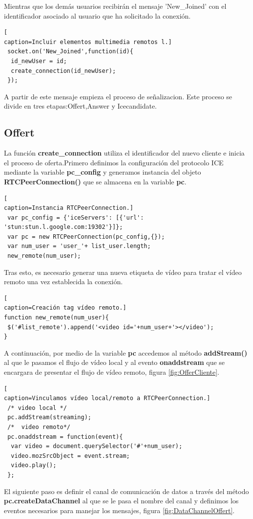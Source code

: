 Mientras que los demás usuarios recibirán el mensaje 'New\_Joined' con el identificador asociado al usuario que ha solicitado la conexión.
\begin{lstlisting}[
caption=Incluir elementos multimedia remotos l.]
 socket.on('New_Joined',function(id){
  id_newUser = id;
  create_connection(id_newUser);
 });
\end{lstlisting}
A partir de este mensaje empieza el proceso de señalizacion. Este proceso se divide en tres etapas:Offert,Answer y Icecandidate.
\subsection*{Offert}
La función \textbf{create\_connection} utiliza el identificador del nuevo cliente e inicia el proceso de oferta.Primero definimos la configuración del  protocolo ICE mediante la variable \textbf{pc\_config} y generamos instancia del objeto \textbf{RTCPeerConnection()} que se almacena en la variable \textbf{pc}.
\begin{lstlisting}[
caption=Instancia RTCPeerConnection.]
 var pc_config = {'iceServers': [{'url': 'stun:stun.l.google.com:19302'}]};
 var pc = new RTCPeerConnection(pc_config,{});
 var num_user = 'user_'+ list_user.length;
 new_remote(num_user);
\end{lstlisting}
Tras esto, es necesario generar una nueva etiqueta de vídeo para tratar el vídeo remoto una vez establecida la conexión.
\begin{lstlisting}[
caption=Creación tag vídeo remoto.]
function new_remote(num_user){
 $('#list_remote').append('<video id='+num_user+'></video');
}
\end{lstlisting}
A continuación, por medio de la variable \textbf{pc} accedemos al método \textbf{addStream()} al que le pasamos el flujo de vídeo local y al evento \textbf{onaddstream} que se encargara de presentar el flujo de vídeo remoto, figura \ref{fig:OfferCliente}.
\begin{lstlisting}[
caption=Vinculamos vídeo local/remoto a RTCPeerConnection.]
 /* video local */
 pc.addStream(streaming);
 /*  video remoto*/
 pc.onaddstream = function(event){
  var video = document.querySelector('#'+num_user);
  video.mozSrcObject = event.stream;
  video.play();
 };
\end{lstlisting}
El siguiente paso es definir el canal de comunicación de datos a través del método \textbf{pc.createDataChannel} al que se le pasa el nombre del canal y definimos los eventos necesarios para manejar los mensajes, figura \ref{fig:DataChannelOffert}.
